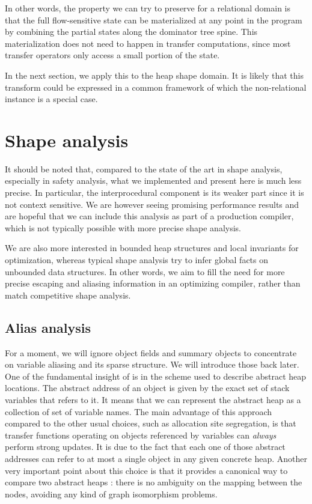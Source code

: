 \documentclass[11pt]{article}
\begin{document}
In other words, the property we can try to preserve for a relational domain is that the full flow-sensitive state can be materialized at any point in the program by combining the partial states along the dominator tree spine.
This materialization does not need to happen in transfer computations, since most transfer operators only access a small portion of the state.

In the next section, we apply this to the heap shape domain.
It is likely that this transform could be expressed in a common framework of which the non-relational instance is a special case.

\section*{Shape analysis}

It should be noted that, compared to the state of the art in shape analysis, especially in safety analysis, what we implemented and present here is much less precise.
In particular, the interprocedural component is its weaker part since it is not context sensitive.
We are however seeing promising performance results and are hopeful that we can include this analysis as part of a production compiler, which is not typically possible with more precise shape analysis.

We are also more interested in bounded heap structures and local invariants for optimization, whereas typical shape analysis try to infer global facts on unbounded data structures. In other words, we aim to fill the need for more precise escaping and aliasing information in an optimizing compiler, rather than match competitive shape analysis.

\subsection*{Alias analysis}
For a moment, we will ignore object fields and summary objects to concentrate on variable aliasing and its sparse structure. We will introduce those back later.
One of the fundamental insight of \cite{ssc} is in the scheme used to describe abstract heap locations.
The abstract address of an object is given by the exact set of stack variables that refers to it.
It means that we can represent the abstract heap as a collection of set of variable names.
The main advantage of this approach compared to the other usual choices, such as allocation site segregation, is that transfer functions operating on objects referenced by variables can \emph{always} perform strong updates.
It is due to the fact that each one of those abstract addresses can refer to at most a single object in any given concrete heap.
Another very important point about this choice is that it provides a canonical way to compare two abstract heaps : there is no ambiguity on the mapping between the nodes, avoiding any kind of graph isomorphism problems.
\end{document}

